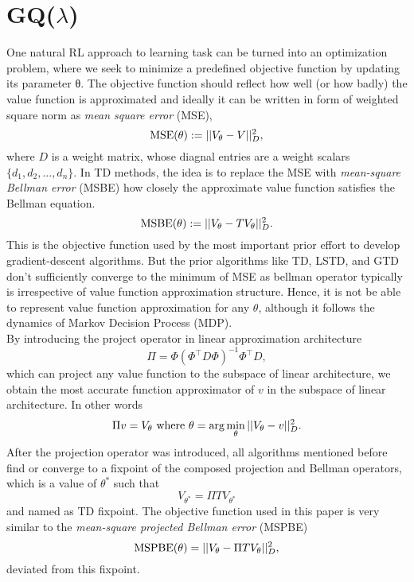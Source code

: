 \documentclass[conference]{IEEEtran}
\begin{document}
\section{GQ($\lambda$)}
One natural RL approach to learning task can be turned into an optimization problem, where we seek to minimize a predefined objective function by updating its parameter θ. The objective function should reflect how well (or how badly) the value function is approximated and ideally it can be written in form of weighted square norm as \textit{mean square error} (\textup{MSE}),
\begin{equation}
    \textup{MSE}(\theta):=||V_\theta-V||^2_D, 
\end{equation}
where $D$ is a weight matrix, whose diagnal entries are a weight scalars $\{d_1, d_2,..., d_n\}$.
In TD methods, the idea is to replace the \textup{MSE} with \textit{mean-square Bellman error} (\textup{MSBE}) \cite{baird1995residual} \cite{baird1999reinforcement} how closely the approximate value function satisfies the Bellman equation.
\begin{equation}
    \textup{MSBE}(\theta):=||V_\theta-TV_\theta||^2_D.
\end{equation}
This is the objective function used by the most important prior effort to develop gradient-descent algorithms. But the prior algorithms like TD, LSTD, and GTD don't sufficiently converge to the minimum of \textup{MSE} as bellman operator typically is irrespective of  value function approximation structure. Hence, it is not be able to represent value function approximation for any $\theta$, although it follows the dynamics of Markov Decision Process (MDP).\\
By introducing the project operator in linear approximation architecture
\begin{equation}
  \Pi = \Phi(\Phi^\top D\Phi)^{-1}\Phi^\top D ,
\end{equation}
which can project any value function to the subspace of linear architecture, we obtain the most accurate function approximator of $v$ in the subspace of linear architecture. In other words
\begin{equation}
  \Pi v = V_\theta \ \textup{where}\ \theta = \arg \min_\theta||V_\theta-v||^2_D.
\end{equation}
After the projection operator was introduced, all algorithms mentioned before find or converge to a fixpoint of the composed projection and Bellman operators, which is a value of $\theta^*$ such that
\begin{equation}
  V_{\theta^*} = \Pi TV_{\theta^*}
\end{equation}
and named as TD fixpoint. The objective function used in this paper is very similar to the \textit{mean-square projected Bellman error} (\textup{MSPBE})
\begin{equation} 
  \textup{MSPBE}(\theta)=||V_{\theta}-\Pi TV_{\theta}||^2_D,
\end{equation}
deviated from this fixpoint.\\
\end{document}
